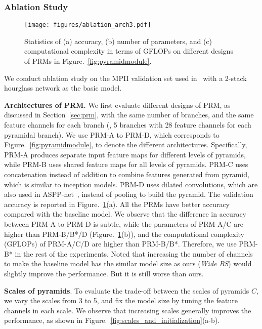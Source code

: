 \documentclass[10pt,twocolumn,letterpaper]{article}
\newcommand{\smalltitle}[1]{\vspace{0.2em}\noindent \textbf{{#1}}}
\begin{document}
\subsubsection{Ablation Study}\label{sec:ablation}
\begin{figure}[t]
\begin{center}
\texttt{[image: figures/ablation\_arch3.pdf]}
\end{center}
   \vspace{-1em}
   \caption{Statistics of (a) accuracy, (b) number of parameters, and (c) computational complexity in terms of GFLOPs on different designs of PRMs in Figure.~\ref{fig:pyramidmodule}.}
\label{fig:ablation_arch}
\vspace{-1em}
\end{figure}

We conduct ablation study on the MPII validation set used in~\cite{tompson2015efficient} with a 2-stack hourglass network as the basic model. 

\smalltitle{Architectures of PRM.} 
We first evaluate different designs of PRM, as discussed in Section~\ref{sec:prm}, with the same number of branches, and the same feature channels for each branch (\eg, 5 branches with 28 feature channels for each pyramidal branch). 
We use PRM-A to PRM-D, which corresponds to Figure.~\ref{fig:pyramidmodule}, to denote the different architectures. 
Specifically, PRM-A produces separate input feature maps for different levels of pyramids, while PRM-B uses shared feature maps for all levels of pyramids. 
PRM-C uses concatenation instead of addition to combine features generated from pyramid, which is similar to inception models. 
PRM-D uses dilated convolutions, which are also used in ASPP-net~\cite{chen2016deeplab}, instead of pooling to build the pyramid. 
The validation accuracy is reported in Figure.~\ref{fig:ablation_arch}(a). 
All the PRMs have better accuracy compared with the baseline model. 
We observe that the difference in accuracy between PRM-A to PRM-D is subtle, while the parameters of PRM-A/C are higher than PRM-B/B*/D (Figure.~\ref{fig:ablation_arch}(b)), and the computational complexity (GFLOPs) of PRM-A/C/D are higher than PRM-B/B*. 
Therefore, we use PRM-B* in the rest of the experiments. 
Noted that increasing the number of channels to make the baseline model has the similar model size as ours (\textit{Wide BS})  would slightly improve the performance. But it is still worse than ours.


\smalltitle{Scales of pyramids}. 
To evaluate the trade-off between the scales of pyramids $C$, we vary the scales from 3 to 5, and fix the model size by tuning the feature channels in each scale.  
We observe that increasing scales generally improves the performance, as shown in Figure.~\ref{fig:scales_and_initialization}(a-b). 
\end{document}
